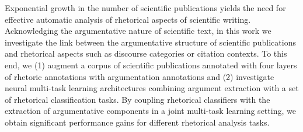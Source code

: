 Exponential growth in the number of scientific publications yields the need for effective automatic analysis of rhetorical aspects of scientific writing. Acknowledging the argumentative nature of scientific text, in this work we investigate the link between the argumentative structure of scientific publications and rhetorical aspects such as discourse categories or citation contexts. To this end, we (1) augment a corpus of scientific publications annotated with four layers of rhetoric annotations with argumentation annotations and (2) investigate neural multi-task learning architectures combining argument extraction with a set of rhetorical classification tasks. By coupling rhetorical classifiers with the extraction of argumentative components in a joint multi-task learning setting, we obtain significant performance gains for different rhetorical analysis tasks.
